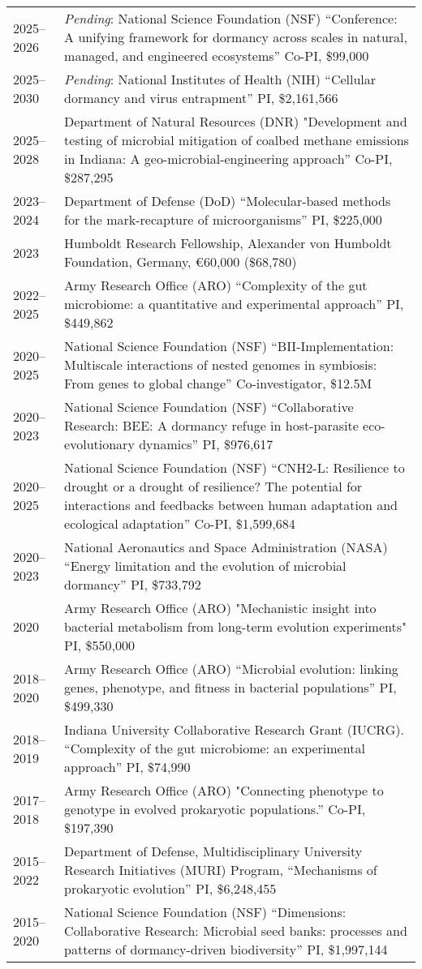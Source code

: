 \documentclass[11pt]{article}  %
\begin{document}
\vspace{-1.25em}
\noindent
\begin{tabularx}{\textwidth}{@{}l@{\hspace{2em}}X@{}}
2025--2026	& \textit{Pending}: National Science Foundation (NSF) “Conference: A unifying framework for dormancy across scales in natural, managed, and engineered ecosystems” Co-PI, \$99,000\\
2025--2030	& \textit{Pending}: National Institutes of Health (NIH) “Cellular dormancy and virus entrapment” PI, \$2,161,566\\
2025--2028 & Department of Natural Resources (DNR) "Development and testing of microbial mitigation of coalbed methane emissions in Indiana: A geo-microbial-engineering approach” Co-PI, \$287,295 \\
2023--2024 & Department of Defense (DoD) “Molecular-based methods for the mark-recapture of microorganisms” PI, \$225,000 \\
2023 & Humboldt Research Fellowship, Alexander von Humboldt Foundation, Germany, €60,000 (\$68,780) \\
2022--2025 & Army Research Office (ARO) “Complexity of the gut microbiome: a quantitative and experimental approach” PI, \$449,862 \\
2020--2025 & National Science Foundation (NSF) “BII-Implementation: Multiscale interactions of nested genomes in symbiosis: From genes to global change” Co-investigator, \$12.5M \\
2020--2023 & National Science Foundation (NSF) “Collaborative Research: BEE: A dormancy refuge in host-parasite eco-evolutionary dynamics” PI, \$976,617 \\
2020--2025 & National Science Foundation (NSF) “CNH2-L: Resilience to drought or a drought of resilience? The potential for interactions and feedbacks between human adaptation and ecological adaptation” Co-PI, \$1,599,684 \\
2020--2023 & National Aeronautics and Space Administration (NASA) “Energy limitation and the evolution of microbial dormancy” PI, \$733,792 \\
2020 & Army Research Office (ARO) "Mechanistic insight into bacterial metabolism from long-term evolution experiments" PI, \$550,000 \\
2018--2020 & Army Research Office (ARO) “Microbial evolution: linking genes, phenotype, and fitness in bacterial populations” PI, \$499,330 \\
2018--2019 & Indiana University Collaborative Research Grant (IUCRG). “Complexity of the gut microbiome: an experimental approach” PI, \$74,990 \\
2017--2018 & Army Research Office (ARO) "Connecting phenotype to genotype in evolved prokaryotic populations.” Co-PI, \$197,390 \\
2015--2022 & Department of Defense, Multidisciplinary University Research Initiatives (MURI) Program, “Mechanisms of prokaryotic evolution” PI, \$6,248,455 \\
2015--2020 & National Science Foundation (NSF) “Dimensions: Collaborative Research: Microbial seed banks: processes and patterns of dormancy-driven biodiversity” PI, \$1,997,144 \
\end{tabularx}
\end{document}
